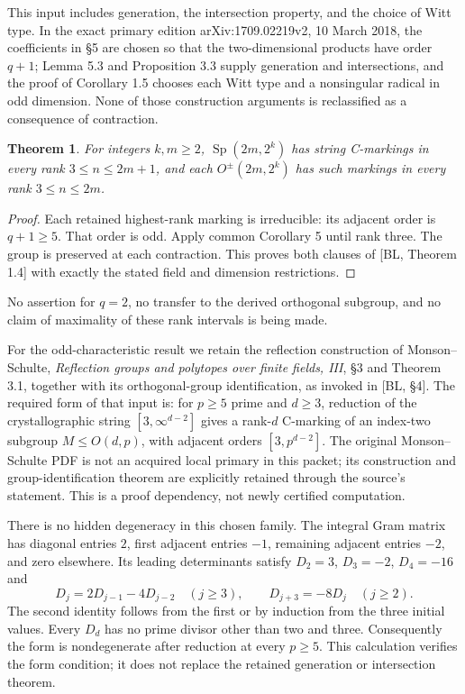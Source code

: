 \documentclass[a4paper,11pt]{article}
\newtheorem{theorem}{Theorem}\newtheorem{proposition}[theorem]{Proposition}
\begin{document}
This input includes generation, the intersection property, and the
choice of Witt type. In the exact primary edition arXiv:1709.02219v2,
10 March 2018, the coefficients in \S5 are chosen so that the two-dimensional
products have order $q+1$; Lemma 5.3 and Proposition 3.3 supply generation
and intersections, and the proof of Corollary 1.5 chooses each Witt type
and a nonsingular radical in odd dimension. None of those construction
arguments is reclassified as a consequence of contraction.

\begin{theorem}\label{evenfield}
For integers $k,m\geq2$, $\operatorname{Sp}(2m,2^k)$ has string
C-markings in every rank $3\leq n\leq2m+1$, and each
$O^{\pm}(2m,2^k)$ has such markings in every rank $3\leq n\leq2m$.
\end{theorem}
\begin{proof}
Each retained highest-rank marking is irreducible: its adjacent order is
$q+1\geq5$. That order is odd. Apply common Corollary 5 until rank three.
The group is preserved at each contraction. This proves both clauses of
[BL, Theorem 1.4] with exactly the stated field and dimension restrictions.
\end{proof}
No assertion for $q=2$, no transfer to the derived orthogonal subgroup,
and no claim of maximality of these rank intervals is being made.

For the odd-characteristic result we retain the reflection construction
of Monson--Schulte, \emph{Reflection groups and polytopes over finite
fields, III}, \S3 and Theorem 3.1, together with its orthogonal-group
identification, as invoked in [BL, \S4]. The required form of that input is:
for $p\geq5$ prime and $d\geq3$, reduction of the crystallographic string
$[3,\infty^{d-2}]$ gives a rank-$d$ C-marking of an index-two subgroup
$M\leq O(d,p)$, with adjacent orders $[3,p^{d-2}]$.
The original Monson--Schulte PDF is not an acquired local primary in this
packet; its construction and group-identification theorem are explicitly
retained through the source's statement. This is a proof dependency, not
newly certified computation.

There is no hidden degeneracy in this chosen family. The integral Gram
matrix has diagonal entries $2$, first adjacent entries $-1$, remaining
adjacent entries $-2$, and zero elsewhere. Its leading determinants satisfy
$D_2=3$, $D_3=-2$, $D_4=-16$ and
\[
 D_j=2D_{j-1}-4D_{j-2}\quad(j\geq3),\qquad D_{j+3}=-8D_j\quad(j\geq2).
\]
The second identity follows from the first or by induction from the three
initial values. Every $D_d$ has no prime divisor other than two and three.
Consequently the form is nondegenerate after reduction at every $p\geq5$.
This calculation verifies the form condition; it does not replace the
retained generation or intersection theorem.
\end{document}

